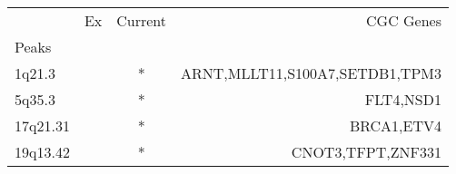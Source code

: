 \begin{tabular}{lccr}
\toprule
{} & Ex & Current &                       CGC Genes \\
Peaks    &    &         &                                 \\
\midrule
1q21.3   &    &       * &  ARNT,MLLT11,S100A7,SETDB1,TPM3 \\
5q35.3   &    &       * &                       FLT4,NSD1 \\
17q21.31 &    &       * &                      BRCA1,ETV4 \\
19q13.42 &    &       * &               CNOT3,TFPT,ZNF331 \\
\bottomrule
\end{tabular}
